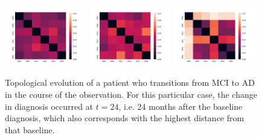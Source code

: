 \documentclass{article}
\begin{document}
\begin{figure}
  \centering
    \includegraphics[width=0.32\textwidth]{figures/temporal_evolution/ADNI029S0878_h_0.png}
    \hfill \includegraphics[width=0.32\textwidth]{figures/temporal_evolution/ADNI029S0878_h_1.png}
    \hfill \includegraphics[width=0.32\textwidth]{figures/temporal_evolution/ADNI029S0878_h_2.png}
    \caption{Topological evolution of a patient who transitions from MCI to AD in the course of the observation. For this particular case, the change in diagnosis occurred at $t=24$, i.e. 24 months after the baseline diagnosis, which also corresponds with the highest distance from that baseline.}
    \label{fig:patient_evolution_mci_ad}
\end{figure}
\end{document}
